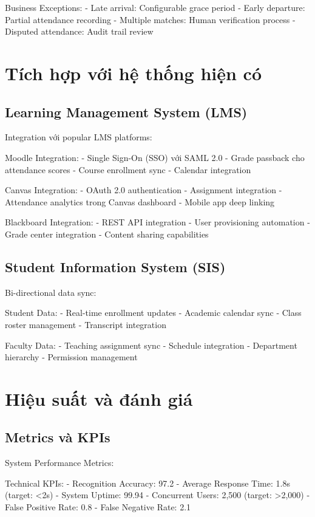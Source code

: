 \documentclass[12pt,a4paper]{report}
\begin{document}
Business Exceptions:
- Late arrival: Configurable grace period
- Early departure: Partial attendance recording
- Multiple matches: Human verification process
- Disputed attendance: Audit trail review

\section{Tích hợp với hệ thống hiện có}
\subsection{Learning Management System (LMS)}
Integration với popular LMS platforms:

Moodle Integration:
- Single Sign-On (SSO) với SAML 2.0
- Grade passback cho attendance scores
- Course enrollment sync
- Calendar integration

Canvas Integration:
- OAuth 2.0 authentication
- Assignment integration
- Attendance analytics trong Canvas dashboard
- Mobile app deep linking

Blackboard Integration:
- REST API integration
- User provisioning automation
- Grade center integration
- Content sharing capabilities

\subsection{Student Information System (SIS)}
Bi-directional data sync:

Student Data:
- Real-time enrollment updates
- Academic calendar sync
- Class roster management
- Transcript integration

Faculty Data:
- Teaching assignment sync
- Schedule integration
- Department hierarchy
- Permission management

\section{Hiệu suất và đánh giá}
\subsection{Metrics và KPIs}
System Performance Metrics:

Technical KPIs:
- Recognition Accuracy: 97.2%
- Average Response Time: 1.8s (target: <2s)
- System Uptime: 99.94%
- Concurrent Users: 2,500 (target: >2,000)
- False Positive Rate: 0.8%
- False Negative Rate: 2.1%
\end{document}
